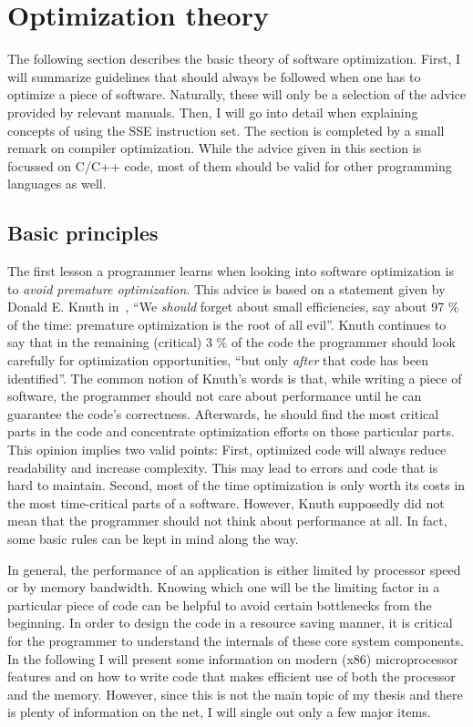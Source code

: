 \section{Optimization theory}
\label{Optimization_theory}
The following section describes the basic theory of software optimization. First, I will summarize guidelines that should always be followed when one has to optimize a piece of software. Naturally, these will only be a selection of the advice provided by relevant manuals. Then, I will go into detail when explaining concepts of using the SSE instruction set. The section is completed by a small remark on compiler optimization. While the advice given in this section is focussed on C/C++ code, most of them should be valid for other programming languages as well.

\subsection{Basic principles}
The first lesson a programmer learns when looking into software optimization is to \emph{avoid premature optimization}. This advice is based on a statement given by Donald E. Knuth in~\cite{knuth1974}, ``We \emph{should} forget about small efficiencies, say about 97 \% of the time: premature optimization is the root of all evil''. Knuth continues to say that in the remaining (critical) 3 \% of the code the programmer should look carefully for optimization opportunities, ``but only \emph{after} that code has been identified''. The common notion of Knuth's words is that, while writing a piece of software, the programmer should not care about performance until he can guarantee the code's correctness. Afterwards, he should find the most critical parts in the code and concentrate optimization efforts on those particular parts. This opinion implies two valid points: First, optimized code will always reduce readability and increase complexity. This may lead to errors and code that is hard to maintain. Second, most of the time optimization is only worth its costs in the most time-critical parts of a software. However, Knuth supposedly did not mean that the programmer should not think about performance at all. In fact, some basic rules can be kept in mind along the way. 

In general, the performance of an application is either limited by processor speed or by memory bandwidth. Knowing which one will be the limiting factor in a particular piece of code can be helpful to avoid certain bottlenecks from the beginning. In order to design the code in a resource saving manner, it is critical for the programmer to understand the internals of these core system components. In the following I will present some information on modern (x86) microprocessor features and on how to write code that makes efficient use of both the processor and the memory. However, since this is not the main topic of my thesis and there is plenty of information on the net, I will single out only a few major items.

